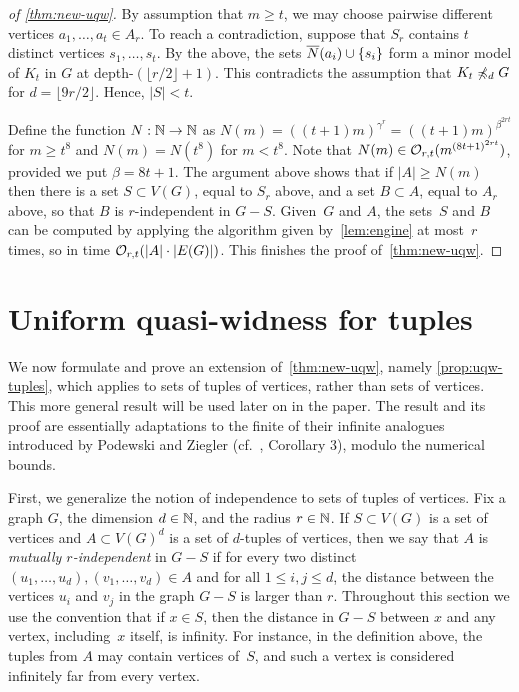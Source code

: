 \begin{proof}[of \cref{thm:new-uqw}]
By assumption that $m\ge t$, we may choose pairwise different vertices $a_1,\ldots,a_t\in A_r$.
To reach a contradiction, suppose that $S_r$ contains $t$ distinct vertices $s_1,\ldots,s_t$. 
By the above, the sets $\overline{N}(a_i)\cup\{s_i\}$ 
form a minor model of $K_t$ in $G$ at depth-$(\lfloor r/2\rfloor+1)$.
This contradicts the assumption that $K_t\not\preccurlyeq_d G$ for $d=\lfloor 9r/2 \rfloor$.
Hence, $|S|<t$.


Define the function  $N:\mathbb{N}\to\mathbb{N}$
as $N(m)=((t+1)m)^{\gamma^{r}}=((t+1)m)^{\beta^{2rt}}$
for $m\ge t^8$  and $N(m)=N(t^8)$ for $m<t^8$.
Note that $N(m)\in \mathcal{O}_{r,t}{(m^{{(8t+1)}^{2rt}})}$, provided we put $\beta=8t+1$.
The argument above shows that if $|A|\ge N(m)$ then 
there is a set $S\subset V(G)$, equal to $S_r$ above,
and a set $B\subset A$, equal to $A_r$ above,
so that $B$ is $r$-independent in $G-S$.
Given~$G$ and $A$, the sets~$S$ and $B$ can be computed by applying the algorithm given by~\cref{lem:engine} at most~$r$ times, so in time $\mathcal{O}_{r,t}(|A|\cdot |E(G)|)$.
This finishes the proof of~\cref{thm:new-uqw}.
\end{proof}



\section{Uniform quasi-widness for tuples}\label{sec:uqw-tuples}
We now formulate and prove an extension of~\cref{thm:new-uqw}, namely \cref{prop:uqw-tuples},
which applies to sets of tuples of vertices, rather than sets of vertices. This more general result will be used later on in the paper. 
The result and its proof are essentially adaptations to the finite of their infinite analogues introduced by Podewski and Ziegler (cf.~\cite{podewski1978stable},  Corollary 3),
modulo the numerical bounds.

First, we generalize the notion of independence to sets of tuples of vertices.
Fix a graph $G$, the dimension $d\in\mathbb{N}$, and the radius $r\in \mathbb{N}$.
If $S\subset V(G)$ is a set of vertices and $A\subset V(G)^d$ is a set of $d$-tuples of vertices,
then we say that $A$ is \emph{mutually $r$-independent} in $G-S$ 
if for every two distinct $(u_1,\ldots,u_d),(v_1,\ldots,v_d)\in A$
and for all $1\le i,j\le d$, the distance between the vertices $u_i$ and $v_j$ in the graph $G-S$
is larger than $r$. Throughout this section we use the convention that if $x\in S$, then the distance in $G-S$ between $x$ and any vertex, including~$x$ itself, is infinity. 
For instance, in the definition above, the tuples from $A$ may contain vertices of~$S$, and such a vertex is considered infinitely far from every vertex.

